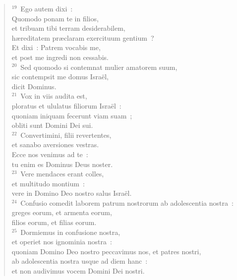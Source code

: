 \begin{flushleft}
\begin{verse}
${}^{19}$~Ego autem dixi~:\\ Quomodo ponam te in filios,\\ et tribuam tibi terram desiderabilem,\\ h\ae reditatem pr\ae claram exercituum gentium~?\\ Et dixi~: Patrem vocabis me,\\ et post me ingredi non cessabis.\\
${}^{20}$~Sed quomodo si contemnat mulier amatorem suum,\\ sic contempsit me domus Isra\"el,\\ dicit Dominus.\\
${}^{21}$~Vox in viis audita est,\\ ploratus et ululatus filiorum Isra\"el~:\\ quoniam iniquam fecerunt viam suam~;\\ obliti sunt Domini Dei sui.\\
${}^{22}$~Convertimini, filii revertentes,\\ et sanabo aversiones vestras.\\ Ecce nos venimus ad te~:\\ tu enim es Dominus Deus noster.\\
${}^{23}$~Vere mendaces erant colles,\\ et multitudo montium~:\\ vere in Domino Deo nostro salus Isra\"el.\\
${}^{24}$~Confusio comedit laborem patrum nostrorum ab adolescentia nostra~:\\ greges eorum, et armenta eorum,\\ filios eorum, et filias eorum.\\
${}^{25}$~Dormiemus in confusione nostra,\\ et operiet nos ignominia nostra~:\\ quoniam Domino Deo nostro peccavimus nos, et patres nostri,\\ ab adolescentia nostra usque ad diem hanc~:\\ et non audivimus vocem Domini Dei nostri.\end{verse}\end{flushleft}


